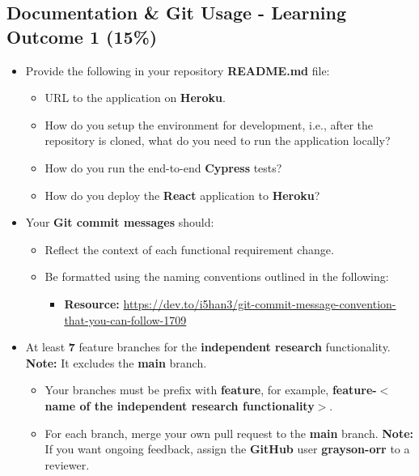\documentclass{article}
\begin{document}
\subsection*{Documentation \& Git Usage - Learning Outcome 1 (15\%)}
\begin{itemize}
	\item Provide the following in your repository \textbf{README.md} file:
	      \begin{itemize}
	      	\item URL to the application on \textbf{Heroku}.
	      	\item How do you setup the environment for development, i.e., after the repository is cloned, what do you need to run the application locally?
	      	\item How do you run the end-to-end \textbf{Cypress} tests?
	      	\item How do you deploy the \textbf{React} application to \textbf{Heroku}?
	      \end{itemize}
\end{itemize}
\begin{itemize}
	\item Your \textbf{Git commit messages} should:
	      \begin{itemize}
	      	\item Reflect the context of each functional requirement change. 
	      	\item Be formatted using the naming conventions outlined in the following:
	      	      \begin{itemize}
	      	      	\item \textbf{Resource:} \small\href{https://dev.to/i5han3/git-commit-message-convention-that-you-can-follow-1709}{https://dev.to/i5han3/git-commit-message-convention-that-you-can-follow-1709}
	      	      \end{itemize} 
	      \end{itemize}
	\item At least \textbf{7} feature branches for the \textbf{independent research} functionality. \textbf{Note:} It excludes the \textbf{main} branch.
	      \begin{itemize}
		      \item Your branches must be prefix with \textbf{feature}, for example, \textbf{feature-$<$name of the independent research functionality$>$}.
		      \item For each branch, merge your own pull request to the \textbf{main} branch. \textbf{Note:} If you want ongoing feedback, assign the \textbf{GitHub} user \textbf{grayson-orr} to a reviewer.
	      \end{itemize}
\end{itemize}
          
\end{document}

